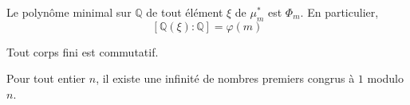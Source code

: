   \begin{corollary}
    Le polynôme minimal sur $\mathbb{Q}$ de tout élément $\xi$ de $\mu_m^*$ est $\Phi_m$. En particulier,
    \[ [\mathbb{Q}(\xi):\mathbb{Q}]=\varphi(m) \]
  \end{corollary}

  \begin{application}
    Tout corps fini est commutatif.
  \end{application}


  \begin{application}
    Pour tout entier $n$, il existe une infinité de nombres premiers congrus à $1$ modulo $n$.
  \end{application}

